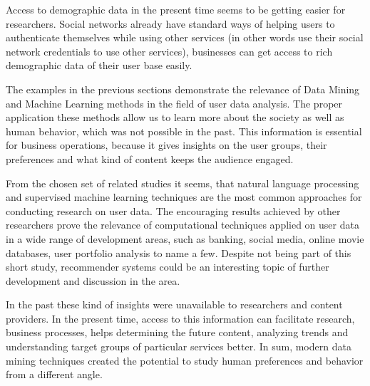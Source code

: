 Access to demographic data in the present time seems to be getting easier for researchers. Social networks already have standard ways of helping users to authenticate themselves while using other services (in other words use their social network credentials to use other services), businesses can get access to rich demographic data of their user base easily. 

The examples in the previous sections demonstrate the relevance of Data Mining and Machine Learning methods in the field of user data analysis. The proper application these methods allow us to learn more about the society as well as human behavior, which was not possible in the past. This information is essential for business operations, because it gives insights on the user groups, their preferences and what kind of content keeps the audience engaged. 

From the chosen set of related studies it seems, that natural language processing and supervised machine learning techniques are the most common approaches for conducting research on user data. The encouraging results achieved by other researchers prove the relevance of computational techniques applied on user data in a wide range of development areas, such as banking, social media, online movie databases, user portfolio analysis to name a few. Despite not being part of this short study, recommender systems could be an interesting topic of further development and discussion in the area.

In the past these kind of insights were unavailable to researchers and content providers. In the present time, access to this information can facilitate research, business processes, helps determining the future content, analyzing trends and understanding target groups of particular services better. In sum, modern data mining techniques created the potential to study human preferences and behavior from a different angle.

